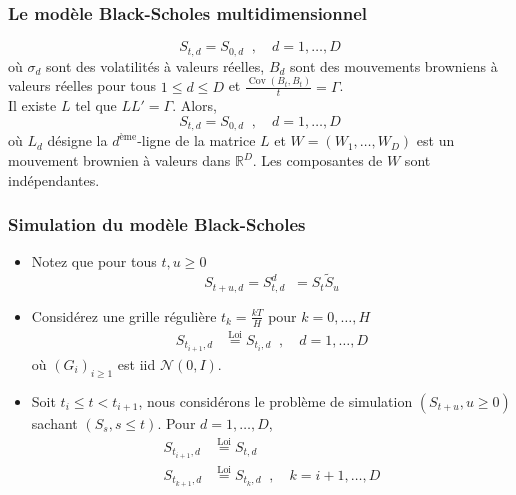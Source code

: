 \documentclass[10pt,color,leqno]{beamer}
\theoremstyle{plain}
\def\cn{{\mathcal N}}
\def\R{{\mathbb R}}
\newcommand{\expp}[1]{\mathop {\mathrm{e}^{ #1}}}
\def\Cov{\mathop{\mathrm{Cov}}}
\begin{document}
\begin{frame}
  \frametitle{Le modèle Black-Scholes multidimensionnel}

  \begin{equation*}
    S_{t,d} = S_{0,d} \expp{(r- {(\sigma_d)}^2/2) t + \sigma_d B_{t,d}}, \quad d=1,\dots, D
  \end{equation*}
  où $\sigma_d$ sont des volatilités à valeurs réelles, $B_d$ sont des mouvements browniens à valeurs réelles pour tous $1 \le d \le D$ et $\frac{\Cov(B_t, B_t)}{t} = \Gamma$. \\

  Il existe $L$ tel que $LL' = \Gamma$. Alors,
  \begin{equation*}
    S_{t,d} = S_{0,d} \expp{(r- {(\sigma_d)}^2/2) t + \sigma_d L_d W_t}, \quad d=1,\dots, D
  \end{equation*}
  où $L_d$ désigne la $d^{\text{ème}}$-ligne de la matrice $L$ et $W = (W_1, \dots, W_D)$ est un mouvement brownien à valeurs dans $\R^D$. Les composantes de $W$ sont indépendantes.

\end{frame}

\begin{frame}
  \frametitle{Simulation du modèle Black-Scholes}

  \begin{itemize}
    \item Notez que pour tous $t, u \ge 0$
      \begin{equation*}
        S_{t+u,d} = S^d_{t,d} \expp{(r- \sigma^2/2) u + \sigma (B_{t+u,d} - B_{t,d})} = S_t \tilde S_u
      \end{equation*}
    \item Considérez une grille régulière $t_k = \frac{kT}{H}$ pour $k=0,\dots,H$
      \begin{align*}
        S_{t_{i+1},d} & \stackrel{\text{Loi}}{=} S_{t_i,d} \expp{(r- {(\sigma_d)}^2/2) \frac{T}{H} + \sigma_d \sqrt{\frac{T}{H}} L_d G_{i+1}}, \quad d=1,\dots, D
      \end{align*}
      où $(G_i)_{i \ge 1}$ est iid $\cn(0, I)$.
    \item Soit $t_{i} \le t < t_{i+1}$, nous considérons le problème de simulation $(S_{t+u}, u \ge 0)$ sachant $(S_s, s \le t)$. Pour $d=1,\dots, D$,
      \begin{align*}
        S_{t_{i+1},d} & \stackrel{\text{Loi}}{=} S_{t,d} \expp{(r- {(\sigma_d)}^2/2) (t_{i+1} - t) + \sigma_d \sqrt{(t_{i+1} - t)}L_d G_{i+1}}                       \\
        S_{t_{k+1},d} & \stackrel{\text{Loi}}{=} S_{t_k,d} \expp{(r- {(\sigma_d)}^2/2) \frac{T}{H} + \sigma_d \sqrt{\frac{T}{H}} L_d G_{k+1}}, \quad k=i+1, \dots, D
      \end{align*}
  \end{itemize}

\end{frame}
\end{document}
